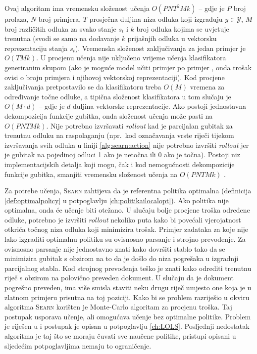 Ovaj algoritam ima vremensku složenost učenja $O(P N T^2 M k)$ -- gdje je $P$
broj prolaza, $N$ broj primjera, $T$ prosječna duljina niza odluka koji
izgrađuju $y \in \mathcal{Y}$, $M$ broj različitih odluka za svako stanje $s_t$
i $k$ broj odluka kojima se uvjetuje trenutna (svodi se samo na dodavanje $k$
prijašnjih odluka u vektorsku reprezentaciju stanja $s_t$). Vremenska složenost
zaključivanja za jedan primjer je $O(T M k)$. U procjenu učenja nije uključeno
vrijeme učenja klasifikatora generiranim skupom (ako je moguće model učiti
primjer po primjer , onda trošak ovisi o broju primjera i njihovoj
vektorskoj reprezentaciji). Kod procjene zaključivanja pretpostavilo se da
klasifikatoru treba $O(M)$ vremena za određivanje točne odluke, a tipična
složenost klasifikatora u tom slučaju je $O(M \cdot d)$ -- gdje je $d$ duljina
vektorske reprezentacije. Ako postoji jednostavna dekompozicija funkcije
gubitka, onda složenost učenja može pasti na $O(P N T M k)$. Nije potrebno
izvršavati \textit{rollout} kad je parcijalan gubitak za trenutnu odluku na
raspolaganju (npr.~kod označavanja vrste riječi tijekom izvršavanja svih odluka
u liniji \ref{alg:searn:action} nije potrebno izvršiti \textit{rollout} jer je
gubitak na pojedinoj odluci 1 ako je netočna ili 0 ako je točna). Postoji niz
implementacijskih detalja koji mogu, čak i kod nemogućnosti dekompozicije
funkcije gubitka, smanjiti vremensku složenost učenja na $O(P N T M k)$
\citep{daume14lts}.

Za potrebe učenja, \textsc{Searn} zahtijeva da je referentna politika optimalna
(definicija \ref{def:optimalpolicy} u potpoglavlju \ref{ch:politikailocalopt}).
Ako politika nije optimalna, onda će učenje biti otežano. U slučaju bolje
procjene troška određene odluke, potrebno je izvršiti \textit{rollout} nekoliko
puta kako bi povećali vjerojatnost otkrića točnog niza odluka koji minimizira
trošak. Primjer zadataka za koje nije lako izgraditi optimalnu politiku su
ovisnosno parsanje i strojno prevođenje. Za ovisnosno parsanje nije jednostavno
znati kako dovršiti stablo tako da se minimizira gubitak s obzirom na to da je
došlo do niza pogrešaka u izgradnji parcijalnog stabla. Kod strojnog prevođenja
teško je znati kako odrediti trenutnu riječ s obzirom na polovično preveden
dokument. U slučaju da je dokument pogrešno preveden, ima više smisla staviti
neku drugu riječ umjesto one koja je u zlatnom primjeru prisutna na toj
poziciji. Kako bi se problem razriješio u okviru algoritma \textsc{Searn}
korišten je Monte-Carlo algoritam za procjenu troška. Taj postupak usporava
učenje, ali omogućava učenje bez optimalne politike. Problem je riješen u
\citep{daume15lols} i postupak je opisan u potpoglavlju \ref{ch:LOLS}.
Posljednji nedostatak algoritma je taj što se moraju čuvati sve naučene
politike, pristupi opisani u sljedećim potpoglavljima nemaju to ograničenje.

